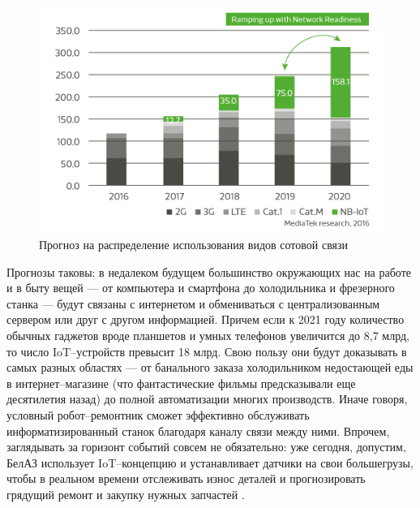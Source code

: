 ~
\begin{figure}[H]
\centering
	\includegraphics[scale=0.8]{figures/nbiotExample.png}
	\caption{Прогноз на распределение использования видов сотовой связи}
	\label{fig:subject:belarus:nbiot}
\end{figure}

Прогнозы таковы: в недалеком будущем большинство окружающих нас на работе и в быту вещей — от компьютера и смартфона до холодильника и фрезерного станка — будут связаны с интернетом и обмениваться с централизованным сервером или друг с другом информацией. Причем если к 2021 году количество обычных гаджетов вроде планшетов и умных телефонов увеличится до 8,7 млрд, то число IoT–устройств превысит 18 млрд. Свою пользу они будут доказывать в самых разных областях — от банального заказа холодильником недостающей еды в интернет–магазине (что фантастические фильмы предсказывали еще десятилетия назад) до полной автоматизации многих производств. Иначе говоря, условный робот–ремонтник сможет эффективно обслуживать информатизированный станок благодаря каналу связи между ними. Впрочем, заглядывать за горизонт событий совсем не обязательно: уже сегодня, допустим, БелАЗ использует IoT–концепцию и устанавливает датчики на свои большегрузы, чтобы в реальном времени отслеживать износ деталей и прогнозировать грядущий ремонт и закупку нужных запчастей \cite{iot_belarus_prog}.